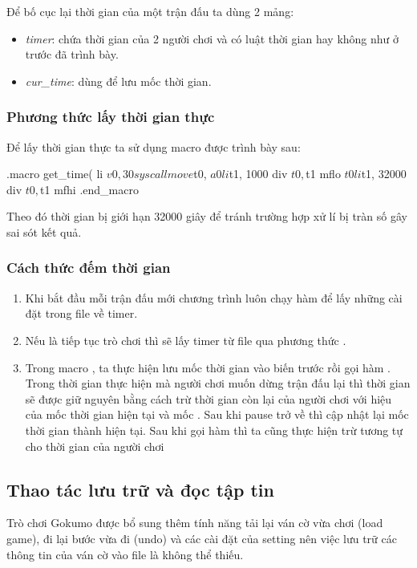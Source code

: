Để bố cục lại thời gian của một trận đấu ta dùng 2 mảng:
\begin{itemize}
   \item \textit{timer}: chứa thời gian của 2 người chơi và có luật thời gian hay không như ở trước đã trình bày.
   \item \textit{cur\_time}: dùng để lưu mốc thời gian.
\end{itemize}

\subsubsection{Phương thức lấy thời gian thực}
Để lấy thời gian thực ta sử dụng macro  được trình bày sau:
\begin{code}
.macro get_time(%
   li $v0, 30
	syscall
	move $t0, $a0 
	li $t1, 1000
	div $t0, $t1
	mflo $t0
	li $t1, 32000
	div $t0, $t1
	mfhi %
.end_macro 
\end{code}
Theo đó thời gian bị giới hạn 32000 giây để tránh trường hợp xử lí bị tràn số gây sai sót kết quả.

\subsubsection{Cách thức đếm thời gian}
\begin{enumerate}
   \item Khi bắt đầu mỗi trận đấu mới chương trình luôn chạy hàm  để lấy những cài đặt trong file  về timer.
   \item Nếu là tiếp tục trò chơi thì sẽ lấy timer từ file  qua phương thức .
   \item Trong macro , ta thực hiện lưu mốc thời gian vào biến  trước rồi gọi hàm . Trong thời gian thực hiện mà người chơi muốn dừng trận đấu lại thì thời gian sẽ được giữ nguyên bằng cách trừ thời gian còn lại của người chơi với hiệu của mốc thời gian hiện tại và mốc . Sau khi pause trở về thì cập nhật lại mốc thời gian  thành hiện tại. Sau khi gọi hàm  thì ta cũng thực hiện trừ tương tự cho thời gian của người chơi
\end{enumerate}

\subsection{Thao tác lưu trữ và đọc tập tin}
Trò chơi Gokumo được bổ sung thêm tính năng tải lại ván cờ vừa chơi (load game), đi lại bước vừa đi (undo) và các cài đặt của setting nên việc lưu trữ các thông tin của ván cờ vào file là không thể thiếu.

